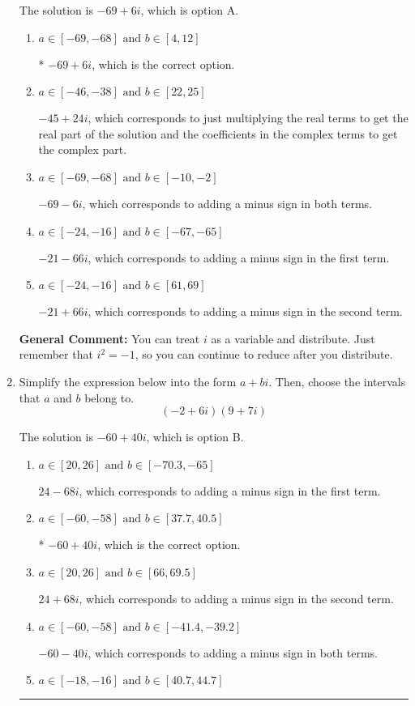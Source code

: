 \documentclass{extbook}[14pt]
\newcommand{\litem}[1]{\item #1

\rule{\textwidth}{0.4pt}}
\begin{document}
\begin{enumerate}
{The solution is \( -69 + 6 i \), which is option A.\begin{enumerate}[label=\Alph*.]
\item \( a \in [-69, -68] \text{ and } b \in [4, 12] \)

* $-69 + 6 i$, which is the correct option.
\item \( a \in [-46, -38] \text{ and } b \in [22, 25] \)

 $-45 + 24 i$, which corresponds to just multiplying the real terms to get the real part of the solution and the coefficients in the complex terms to get the complex part.
\item \( a \in [-69, -68] \text{ and } b \in [-10, -2] \)

 $-69 - 6 i$, which corresponds to adding a minus sign in both terms.
\item \( a \in [-24, -16] \text{ and } b \in [-67, -65] \)

 $-21 - 66 i$, which corresponds to adding a minus sign in the first term.
\item \( a \in [-24, -16] \text{ and } b \in [61, 69] \)

 $-21 + 66 i$, which corresponds to adding a minus sign in the second term.
\end{enumerate}

\textbf{General Comment:} You can treat $i$ as a variable and distribute. Just remember that $i^2=-1$, so you can continue to reduce after you distribute.
}
\litem{
Simplify the expression below into the form $a+bi$. Then, choose the intervals that $a$ and $b$ belong to.
\[ (-2 + 6 i)(9 + 7 i) \]

The solution is \( -60 + 40 i \), which is option B.\begin{enumerate}[label=\Alph*.]
\item \( a \in [20, 26] \text{ and } b \in [-70.3, -65] \)

 $24 - 68 i$, which corresponds to adding a minus sign in the first term.
\item \( a \in [-60, -58] \text{ and } b \in [37.7, 40.5] \)

* $-60 + 40 i$, which is the correct option.
\item \( a \in [20, 26] \text{ and } b \in [66, 69.5] \)

 $24 + 68 i$, which corresponds to adding a minus sign in the second term.
\item \( a \in [-60, -58] \text{ and } b \in [-41.4, -39.2] \)

 $-60 - 40 i$, which corresponds to adding a minus sign in both terms.
\item \( a \in [-18, -16] \text{ and } b \in [40.7, 44.7] \)


\end{enumerate}}
\end{enumerate}
\end{document}
